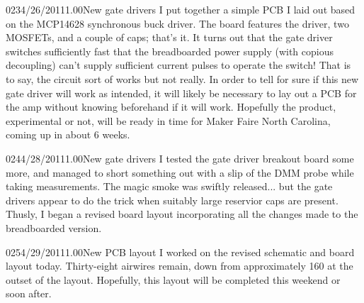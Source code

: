 \documentclass[12pt,letterpaper,onecolumn]{article}
\begin{document}
\begin{nbentry}{023}{4/26/2011}{1.00}{New gate drivers}
I put together a simple PCB I laid out based on the MCP14628 synchronous buck driver.  The board features the driver, two MOSFETs, and a couple of caps; that's it.  It turns out that the gate driver switches sufficiently fast that the breadboarded power supply (with copious decoupling) can't supply sufficient current pulses to operate the switch!  That is to say, the circuit sort of works but not really.  In order to tell for sure if this new gate driver will work as intended, it will likely be necessary to lay out a PCB for the amp without knowing beforehand if it will work.  Hopefully the product, experimental or not, will be ready in time for Maker Faire North Carolina, coming up in about 6 weeks.
\end{nbentry}

\begin{nbentry}{024}{4/28/2011}{1.00}{New gate drivers}
I tested the gate driver breakout board some more, and managed to short something out with a slip of the DMM probe while taking measurements.  The magic smoke was swiftly released... but the gate drivers appear to do the trick when suitably large reservior caps are present.  Thusly, I began a revised board layout incorporating all the changes made to the breadboarded version.
\end{nbentry}

\begin{nbentry}{025}{4/29/2011}{1.00}{New PCB layout}
I worked on the revised schematic and board layout today.  Thirty-eight airwires remain, down from approximately 160 at the outset of the layout.  Hopefully, this layout will be completed this weekend or soon after.
\end{nbentry}
\end{document}
